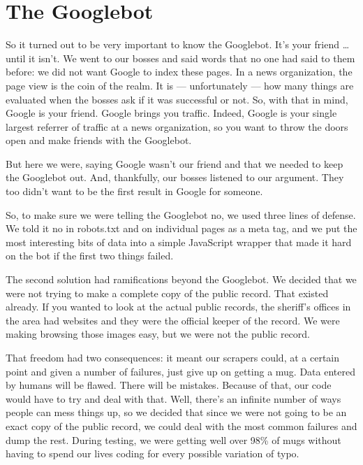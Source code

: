 \documentclass[
  letterpaper,
  DIV=11,
  numbers=noendperiod]{scrreprt}
\begin{document}
\hypertarget{the-googlebot}{%
\section{The Googlebot}\label{the-googlebot}}

So it turned out to be very important to know the Googlebot. It's your
friend \ldots{} until it isn't. We went to our bosses and said words
that no one had said to them before: we did not want Google to index
these pages. In a news organization, the page view is the coin of the
realm. It is --- unfortunately --- how many things are evaluated when
the bosses ask if it was successful or not. So, with that in mind,
Google is your friend. Google brings you traffic. Indeed, Google is your
single largest referrer of traffic at a news organization, so you want
to throw the doors open and make friends with the Googlebot.

But here we were, saying Google wasn't our friend and that we needed to
keep the Googlebot out. And, thankfully, our bosses listened to our
argument. They too didn't want to be the first result in Google for
someone.

So, to make sure we were telling the Googlebot no, we used three lines
of defense. We told it no in robots.txt and on individual pages as a
meta tag, and we put the most interesting bits of data into a simple
JavaScript wrapper that made it hard on the bot if the first two things
failed.

The second solution had ramifications beyond the Googlebot. We decided
that we were not trying to make a complete copy of the public record.
That existed already. If you wanted to look at the actual public
records, the sheriff's offices in the area had websites and they were
the official keeper of the record. We were making browsing those images
easy, but we were not the public record.

That freedom had two consequences: it meant our scrapers could, at a
certain point and given a number of failures, just give up on getting a
mug. Data entered by humans will be flawed. There will be mistakes.
Because of that, our code would have to try and deal with that. Well,
there's an infinite number of ways people can mess things up, so we
decided that since we were not going to be an exact copy of the public
record, we could deal with the most common failures and dump the rest.
During testing, we were getting well over 98\% of mugs without having to
spend our lives coding for every possible variation of typo.
\end{document}
